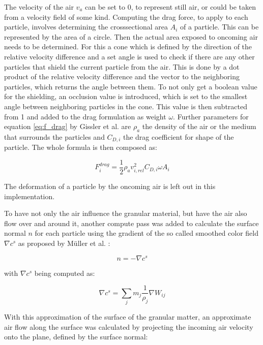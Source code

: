\documentclass[intern]{cgMA}
\begin{document}
    The velocity of the air $v_a$ can be set to 0, to represent still air, or could be taken from a velocity field of some kind. Computing the drag force, to apply to each particle, involves determining the crosssectional area $A_i$ of a particle. This can be represented by the area of a circle. Then the actual area exposed to oncoming air needs to be determined. For this a cone which is defined by the direction of the relative velocity difference and a set angle is used to check if there are any other particles that shield the current particle from the air. This is done by a dot product of the relative velocity difference and the vector to the neighboring particles, which returns the angle between them. To not only get a boolean value for the shielding, an occlusion value is introduced, which is set to the smallest angle between neighboring particles in the cone. This value is then subtracted from 1 and added to the drag formulation as weight $\omega$. Further parameters for equation \ref{eq:f_drag} by Gissler et al. \cite{10.1016/j.cag.2017.09.002} are $\rho_a$ the density of the air or the medium that surrounds the particles and $C_{D,i}$ the drag coefficient for shape of the particle. The whole formula is then composed as: 

    \begin{equation}
        F^{drag}_i = \frac{1}{2}\rho_a v^2_{i,rel} C_{D,i}  \omega  A_i
        \label{eq:f_drag}
    \end{equation}

    The deformation of a particle by the oncoming air is left out in this implementation.

    To have not only the air influence the granular material, but have the air also flow over and around it, another compute pass was added to calculate the surface normal $n$ for each particle using the gradient of the so called smoothed color field $\nabla c^s$ as proposed by Müller et al. \cite{10.5555/846276.846298}:

    \begin{equation}
        n = -\nabla c^s
    \end{equation}

    with $\nabla c^s$ being computed as: 

    \begin{equation}
        \nabla c^s = \sum_j m_j \frac{1}{\rho_j} \nabla W_{ij}
    \end{equation}

    With this approximation of the surface of the granular matter, an approximate air flow along the surface was calculated by projecting the incoming air velocity onto the plane, defined by the surface normal:
\end{document}

